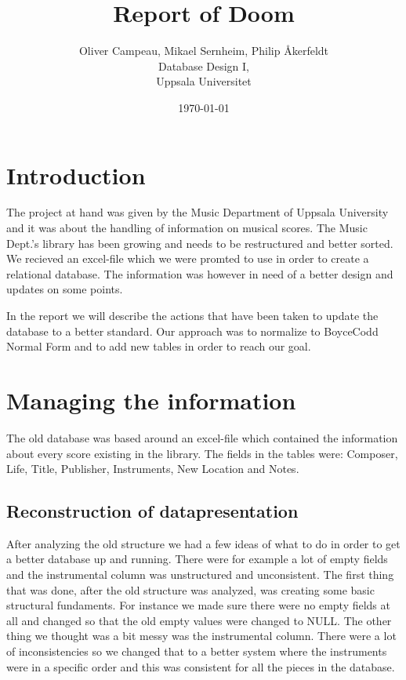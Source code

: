 \documentclass{article}
\begin{document}
\title{Report of Doom}
\author{Oliver Campeau, Mikael Sernheim, Philip \AA kerfeldt \\
Database Design I,\\
Uppsala Universitet\\
}
\date{\today}
\maketitle
\newpage

\section{Introduction}
The project at hand was given by the Music Department of Uppsala University and it was about the handling of information on musical scores. The Music Dept.’s library has been growing and needs to be restructured and better sorted. We recieved an excel-file which we were promted to use in order to create a relational database. The information was however in need of a better design and updates on some points.

In the report we will describe the actions that have been taken to update the database to a better standard. Our approach was to normalize to BoyceCodd Normal Form and to add new tables in order to reach our goal.

\section{Managing the information}
The old database was based around an excel-file which contained the information about every score existing in the library. The fields in the tables were: Composer, Life, Title, Publisher, Instruments, New Location and Notes.
 

\subsection{Reconstruction of datapresentation}
After analyzing the old structure we had a few ideas of what to do in order to get a better database up and running. There were for example a lot of empty fields and the instrumental column was unstructured and unconsistent.
The first thing that was done, after the old structure was analyzed, was creating some basic structural fundaments. For instance we made sure there were no empty fields at all and changed so that the old empty values were changed to NULL.
The other thing we thought was a bit messy was the instrumental column. There were a lot of inconsistencies so we changed that to a better system where the instruments were in a specific order and this was consistent for all the pieces in the database.   
\end{document}
